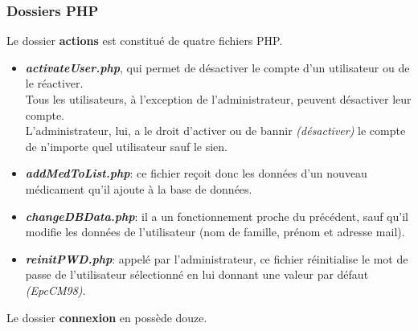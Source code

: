 \subsubsection{Dossiers PHP}
\label{sec:folder-php}

Le dossier \textbf{actions} est constitué de quatre fichiers PHP.

\begin{itemize}

    \item \textbf{\textit{activateUser.php}}, qui permet de désactiver le compte d’un utilisateur ou de le réactiver.\\
    Tous les utilisateurs, à l’exception de l’administrateur, peuvent désactiver leur compte.\\
    L’administrateur, lui, a le droit d’activer ou de bannir \textit{(désactiver)} le compte de n’importe quel utilisateur sauf le sien.
    
    \item \textbf{\textit{addMedToList.php}}: ce fichier reçoit donc les données d’un nouveau médicament qu’il ajoute à la base de données.
    
    \item \textbf{\textit{changeDBData.php}}: il a un fonctionnement proche du précédent, sauf qu’il modifie les données de l’utilisateur (nom de famille, prénom et adresse mail).
    
    \item \textbf{\textit{reinitPWD.php}}: appelé par l’administrateur, ce fichier réinitialise le mot de passe de l’utilisateur sélectionné en lui donnant une valeur par défaut \textit{(EpcCM98)}.

\end{itemize}

\newpage

Le dossier \textbf{connexion} en possède douze.


